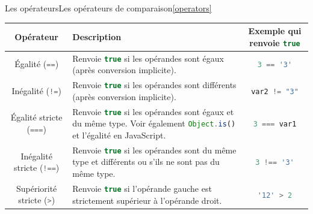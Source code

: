 \documentclass{beamer}
\begin{document}
\begin{frame}[fragile]{Les opérateurs}{Les opérateurs de comparaison\cref{operators}}
    \begin{tiny}
        \begin{table}[h!]
            \centering
            \begin{tabular}{|c|p{4cm}|c|}
                \hline
                \textbf{Opérateur}                                       & \textbf{Description}                                                                                                                                                               & \textbf{Exemple qui renvoie \lstinline[language=Javascript]!true!} \\
                \hline
                Égalité (\lstinline[language=Javascript]!==!)            & Renvoie \lstinline[language=Javascript]!true! si les opérandes sont égaux (après conversion implicite).                                                                            & \lstinline[language=Javascript]!3 == '3'!                          \\
                \hline
                Inégalité (\lstinline[language=Javascript]|!=|)          & Renvoie \lstinline[language=Javascript]!true! si les opérandes sont différents (après conversion implicite).                                                                       & \lstinline[language=Javascript]|var2 != "3"|                       \\
                \hline
                Égalité stricte (\lstinline[language=Javascript]!===!)   & Renvoie \lstinline[language=Javascript]!true! si les opérandes sont égaux et du même type. Voir également \lstinline[language=Javascript]!Object.is()! et l'égalité en JavaScript. & \lstinline[language=Javascript]!3 === var1!                        \\
                \hline
                Inégalité stricte (\lstinline[language=Javascript]|!==|) & Renvoie \lstinline[language=Javascript]!true! si les opérandes sont du même type et différents ou s'ils ne sont pas du même type.                                                  & \lstinline[language=Javascript]|3 !== '3'|                         \\
                \hline
                Supériorité stricte (\lstinline[language=Javascript]!>!) & Renvoie \lstinline[language=Javascript]!true! si l'opérande gauche est strictement supérieur à l'opérande droit.                                                                   & \lstinline[language=Javascript]!'12' > 2!                          \\

\end{tabular}
\end{table}
\end{tiny}
\end{frame}
\end{document}
